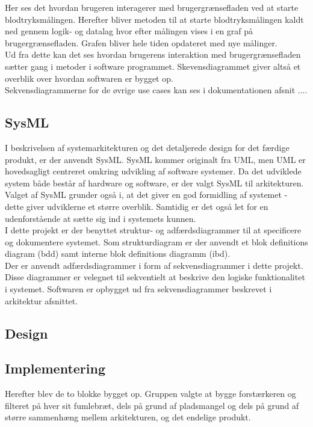 Her ses det hvordan brugeren interagerer med brugergrænsefladen ved at starte blodtryksmålingen. Herefter bliver metoden til at starte blodtryksmålingen kaldt ned gennem logik- og datalag hvor efter målingen vises i en graf på brugergrænsefladen. Grafen bliver hele tiden opdateret med nye målinger.\\
Ud fra dette kan det ses hvordan brugerens interaktion med brugergrænsefladen sætter gang i metoder i software programmet. Skevensdiagrammet giver altså et overblik over hvordan softwaren er bygget op.\\
Sekvensdiagrammerne for de øvrige use cases kan ses i dokumentationen afsnit ....
  
 \subsection{SysML}
 I beskrivelsen af systemarkitekturen og det detaljerede design for det færdige produkt, er der 
anvendt SysML. SysML kommer originalt fra UML, men UML er hovedsagligt centreret omkring udvikling af software systemer. Da det udviklede system både består af hardware og software, er der valgt SysML til arkitekturen.\\
Valget af SysML grunder også i, at det giver en god formidling af systemet - dette giver udviklerne et større overblik. Samtidig er det også let for en udenforstående at sætte sig ind i systemets kunnen.\\

I dette projekt er der benyttet struktur- og adfærdsdiagrammer til at specificere og 
dokumentere systemet. Som strukturdiagram er der anvendt et blok definitions diagram (bdd) samt interne blok definitions diagramm (ibd).\\
Der er anvendt adfærdsdiagrammer i form af sekvensdiagrammer i dette projekt. Disse 
diagrammer er velegnet til sekventielt at beskrive den logiske funktionalitet i systemet.
Softwaren er opbygget ud fra sekvensdiagrammer beskrevet i arkitektur afsnittet. 



\subsection{Design}


\subsection{Implementering}
Herefter blev de to blokke bygget op. Gruppen valgte at bygge forstærkeren og filteret på hver sit fumlebræt, dels på grund af pladsmangel og dels på grund af større sammenhæng mellem arkitekturen, og det endelige produkt.\\


